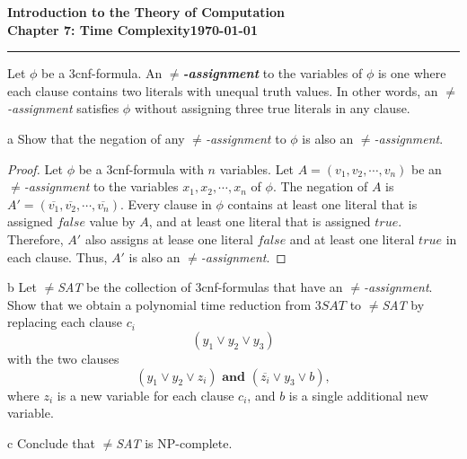 \documentclass[11pt]{article}
\newcommand{\dated}{\today}
\begin{document}
\textbf{Introduction to the Theory of
Computation}\hfill\textbf{\myname}\\[0.01in]
\textbf{Chapter 7: Time Complexity}\hfill\textbf{\dated}\\
\smallskip\hrule\bigskip

\begin{problem}{7.26}
Let $\phi$ be a 3cnf-formula. An \textbf{$\neq$\textit{-assignment}} to the variables of $\phi$ is one where each clause contains two literals with unequal truth values. In other words, an $\neq$\textit{-assignment} satisfies $\phi$ without assigning three true literals in any clause.
\end{problem} 

\begin{problem}[Part]{a}
Show that the negation of any $\neq$\textit{-assignment} to $\phi$ is also an $\neq$\textit{-assignment}.
\end{problem}

\begin{proof}
Let $\phi$ be a 3cnf-formula with $n$ variables. Let $A = (v_1, v_2, \cdots, v_n)$ be an $\neq$\textit{-assignment} to the variables $x_1, x_2, \cdots, x_n$ of $\phi$. The negation of $A$ is $A' = (\overline{v_1}, \overline{v_2}, \cdots, \overline{v_n})$. Every clause in $\phi$ contains at least one literal that is assigned $false$ value by $A$, and at least one literal that is assigned $true$. Therefore, $A'$ also assigns at lease one literal $false$ and at least one literal $true$ in each clause. Thus, $A'$ is also an $\neq$\textit{-assignment}.
\end{proof}

\begin{problem}[Part]{b}
Let $\neq$\textit{SAT} be the collection of 3cnf-formulas that have an $\neq$\textit{-assignment}. Show that we obtain a polynomial time reduction from $3SAT$ to $\neq$\textit{SAT} by replacing each clause $c_i$
\[
(y_1 \vee y_2 \vee y_3)
\]
with the two clauses
\[
(y_1 \vee y_2 \vee z_i) \textbf{ and } (\overline{z_i} \vee y_3 \vee b),
\]
where $z_i$ is a new variable for each clause $c_i$, and $b$ is a single additional new variable.
\end{problem}

\begin{problem}[Part]{c}
Conclude that $\neq$\textit{SAT} is NP-complete.
\end{problem}
\end{document}
